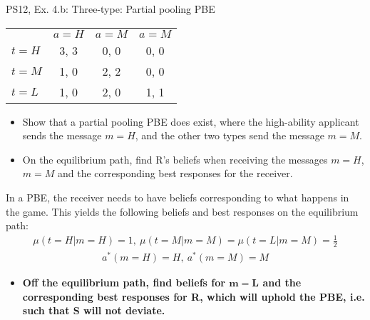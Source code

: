 \begin{frame}{PS12, Ex. 4.b: Three-type: Partial pooling PBE}
    \begin{table}
      \begin{tabular}{l|c|c|c|}
          \multicolumn{1}{c}{} & \multicolumn{1}{c}{$a=H$} & \multicolumn{1}{c}{$a=M$} & \multicolumn{1}{c}{$a=M$} \\\cline{2-4}
          $t=H$ & 3, 3 & 0, 0 & 0, 0 \\\cline{2-4}
          $t=M$ & 1, 0 & 2, 2 & 0, 0 \\\cline{2-4}
          $t=L$ & 1, 0 & 2, 0 & 1, 1 \\\cline{2-4}
      \end{tabular}
    \end{table}\vspace{-8pt}
    \begin{itemize}
      \item[(b)] Show that a partial pooling PBE does exist, where the high-ability applicant sends the message $m = H$, and the other two types send the message $m = M$.
      \item[Step 1:] On the equilibrium path, find R's beliefs when receiving the messages $m=H$, $m=M$ and the corresponding best responses for the receiver.
    \end{itemize}\vspace{-6pt}
    In a PBE, the receiver needs to have beliefs corresponding to what happens in the game. This yields the following beliefs and best responses on the equilibrium path:\vspace{-2pt}
    \begin{align*}
        \mu(t=H|m=H)=1,\
        \mu(t=M|m=M)=\mu(t=L|m=M)=\frac{1}{2}
    \end{align*}\vspace{-18pt}
    \begin{align*}
        a^*(m=H)=H,\ a^*(m=M)=M
    \end{align*}\vspace{-18pt}
    \begin{itemize}
      \item[Step 2:] \textbf{Off the equilibrium path, find beliefs for $\bm{m=L}$ and the corresponding best responses for R, which will uphold the PBE, i.e. such that S will not deviate.}
    \end{itemize}\vspace{-6pt}
    \vfill\null
\end{frame}
